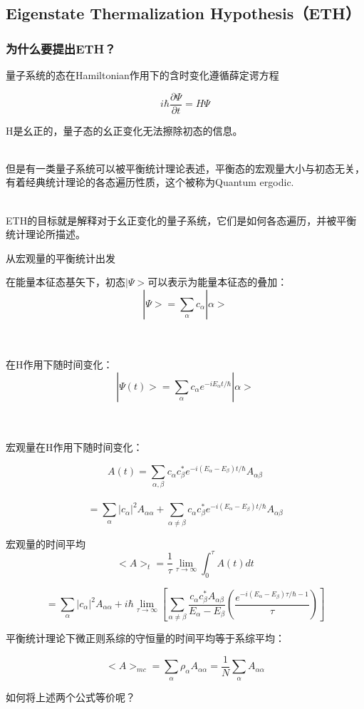 \documentclass{beamer}
\begin{document}
\subsection{Eigenstate Thermalization Hypothesis（ETH）}
\begin{frame}
\frametitle{为什么要提出ETH？}
量子系统的态在Hamiltonian作用下的含时变化遵循薛定谔方程

$$ i \hbar\frac{\partial \Psi}{\partial t}=H\Psi$$

\pause H是幺正的，量子态的幺正变化无法擦除初态的信息。
\\~

\pause 但是有一类量子系统可以被平衡统计理论表述，平衡态的宏观量大小与初态无关，有着经典统计理论的各态遍历性质，这个被称为Quantum ergodic.
\\~

\pause ETH的目标就是解释对于幺正变化的量子系统，它们是如何各态遍历，并被平衡统计理论所描述。

\end{frame}

\begin{frame}{从宏观量的平衡统计出发}

在能量本征态基矢下，初态$|\Psi>$可以表示为能量本征态的叠加：
$$|\Psi>=\sum_{\alpha}c_{\alpha}|\alpha>$$
\\~

在H作用下随时间变化：
$$|\Psi(t)>=\sum_{\alpha}c_{\alpha}e^{-i E_\alpha t/\hbar}|\alpha>$$
\\~

宏观量在H作用下随时间变化：


$$A(t)=\sum_{\alpha,\beta}c_{\alpha}c_{\beta}^{*}e^{-i(E_\alpha-E_\beta) t/\hbar}A_{\alpha \beta}$$\\

$$=\sum_{\alpha}|c_{\alpha}|^{2}A_{\alpha \alpha}+\sum_{\alpha \ne \beta}c_{\alpha}c_{\beta}^{*}e^{-i(E_\alpha-E_\beta) t/\hbar}A_{\alpha \beta}$$
\end{frame}

\begin{frame}
宏观量的时间平均
$$<A>_t=\frac{1}{\tau}\lim_{\tau \to \infty}\int_{0}^{\tau}A(t)dt $$

$$=\sum_{\alpha}|c_{\alpha}|^{2}A_{\alpha \alpha}+i\hbar\lim_{\tau\to \infty}[\sum_{\alpha\ne\beta}\frac{c_{\alpha}c_{\beta}^{*}A_{\alpha \beta}}{E_\alpha-E_\beta}(\frac{e^{-i(E_\alpha-E_\beta)\tau/\hbar-1}}{\tau})]$$

平衡统计理论下微正则系综的守恒量的时间平均等于系综平均：

$$<A>_{mc}=\sum_{\alpha}{\rho_\alpha A_{\alpha\alpha}}=\frac{1}{N}\sum_{\alpha}{A_{\alpha\alpha}}$$

\pause 如何将上述两个公式等价呢？

\end{frame}
\end{document}
